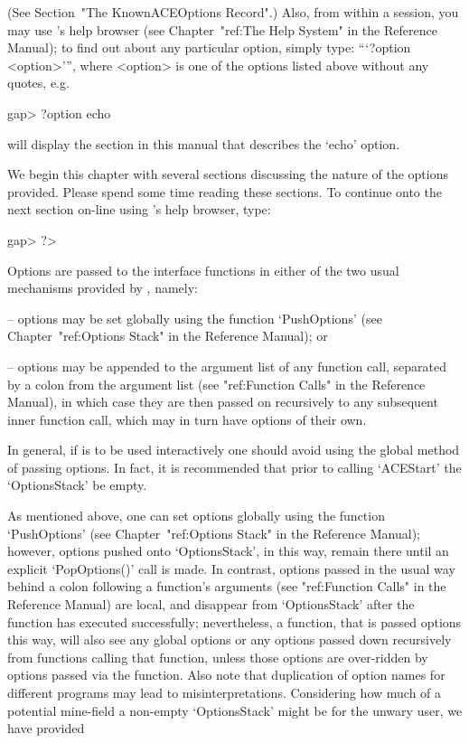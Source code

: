 (See Section~"The KnownACEOptions Record".) Also, from within a {\GAP}
session, you may use {\GAP}'s help browser (see Chapter~"ref:The  Help
System" in the  {\GAP}  Reference  Manual);  to  find  out  about  any
particular {\ACE} option, simply type: ```?option  <option>''',  where
<option> is one of the options listed above without any quotes, e.g.

\begintt
gap> ?option echo
\endtt

will display the section in this  manual  that  describes  the  `echo'
option.

We begin this chapter with several sections discussing the  nature  of
the options provided. Please spend some time reading  these  sections.
To continue onto the next section on-line using {\GAP}'s help browser,
type:

\begintt
gap> ?>
\endtt


Options are passed to the {\ACE} interface functions in either of the
two usual mechanisms provided by {\GAP}, namely:

\beginlist

\item{--} options may be set globally using the function `PushOptions'
(see Chapter~"ref:Options Stack" in the {\GAP} Reference  Manual); or

\item{--} options may be appended to the argument list of any function
call, separated by a colon from the argument list  (see  "ref:Function
Calls" in the {\GAP} Reference Manual), in which case  they  are  then
passed on recursively to any subsequent inner function call, which may
in turn have options of their own.

\endlist

In general, if {\ACE} is to be used  interactively  one  should  avoid
using the global method of passing options. In fact, it is recommended
that prior to calling `ACEStart' the `OptionsStack' be empty.


As mentioned above, one can set options globally  using  the  function
`PushOptions' (see Chapter~"ref:Options Stack" in the {\GAP} Reference
Manual); however, options pushed onto  `OptionsStack',  in  this  way,
remain there  until  an  explicit  `PopOptions()'  call  is  made.  In
contrast, options passed in the usual way behind a colon  following  a
function's arguments (see "ref:Function Calls" in the {\GAP} Reference
Manual)  are  local,  and  disappear  from  `OptionsStack'  after  the
function has executed successfully; nevertheless, a function, that  is
passed options this way, will also  see  any  global  options  or  any
options passed down recursively from functions calling that  function,
unless those  options  are  over-ridden  by  options  passed  via  the
function. Also note that duplication of  option  names  for  different
programs may lead to misinterpretations. Considering  how  much  of  a
potential mine-field a  non-empty  `OptionsStack'  might  be  for  the
unwary user, we have provided

